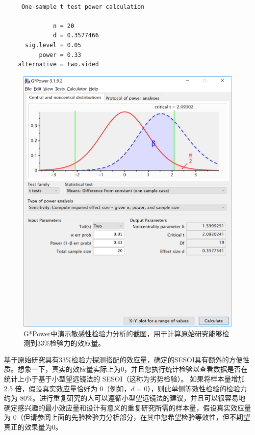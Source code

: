 \documentclass[
  letterpaper,
  DIV=11,
  numbers=noendperiod]{scrreprt}
\begin{document}
\begin{verbatim}

     One-sample t test power calculation 

              n = 20
              d = 0.3577466
      sig.level = 0.05
          power = 0.33
    alternative = two.sided
\end{verbatim}

\begin{figure}

{\centering \includegraphics[width=1\textwidth,height=\textheight]{images/0deabffd850f7b63c16e41e0af9ae0b6.png}

}

\caption{\label{fig-smalltelpower}G*Power中演示敏感性检验力分析的截图，用于计算原始研究能够检测到33\%检验力的效应量。}

\end{figure}

基于原始研究具有33\%检验力探测搭配的效应量，确定的SESOI具有额外的方便性质。想象一下，真实的效应量实际上为0，并且您执行统计检验以查看数据是否在统计上小于基于小型望远镜法的
SESOI（这称为劣势检验）。 如果将样本量增加 2.5 倍，假设真实效应量恰好为
0（例如，\emph{d} = 0），则此单侧等效性检验的检验力约为
80\%。进行重复研究的人可以遵循小型望远镜法的建议，并且可以很容易地确定感兴趣的最小效应量和设计有意义的重复研究所需的样本量，假设真实效应量为
0（但请参阅上面的先验检验力分析部分，在其中您希望检验等效性，但不期望真正的效果量为0。
\end{document}
